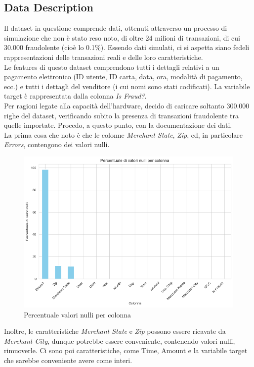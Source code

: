 \documentclass[]{article}
\begin{document}
    \subsection{Data Description}
        Il dataset in questione comprende dati, ottenuti attraverso un processo di simulazione che non è stato reso noto, di oltre 24 milioni di transazioni, di cui 30.000 fraudolente (cioè lo 0.1\%). Essendo dati simulati, ci si aspetta siano fedeli rappresentazioni delle transazioni reali e delle loro caratteristiche.\\
        Le features di questo dataset comprendono tutti i dettagli relativi a un pagamento elettronico (ID utente, ID carta, data, ora, modalità di pagamento, ecc.) e tutti i dettagli del venditore (i cui nomi sono stati codificati). La variabile target è rappresentata dalla colonna \textit{Is Fraud?}.\\
        Per ragioni legate alla capacità dell'hardware, decido di caricare soltanto 300.000 righe del dataset, verificando subito la presenza di transazioni fraudolente tra quelle importate.
        Procedo, a questo punto, con la documentazione dei dati.\\
        La prima cosa che noto è che le colonne \textit{Merchant State}, \textit{Zip}, ed, in particolare \textit{Errors}, contengono dei valori nulli.
        \begin{figure}[H]
            \centering
            \includegraphics[width=.6\textwidth]{img/NullValuesPercentage.png}
            \caption[short]{Percentuale valori nulli per colonna}
        \end{figure}
        Inoltre, le caratteristiche \textit{Merchant State} e \textit{Zip} possono essere ricavate da \textit{Merchant City}, dunque potrebbe essere conveniente, contenendo valori nulli, rimuoverle. Ci sono poi caratteristiche, come Time, Amount e la variabile target che sarebbe conveniente avere come interi.
\end{document}
